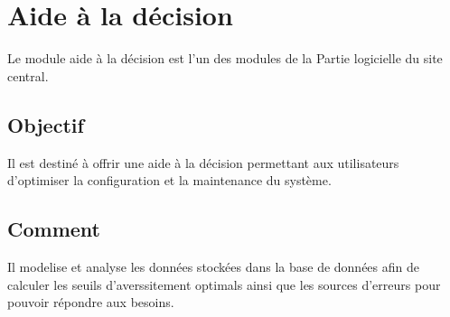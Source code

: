 \section{Aide à la décision}
Le module aide à la décision est l'un des modules de la Partie logicielle du site central. 

\subsection{Objectif}Il est destiné à offrir une aide à la décision permettant aux utilisateurs 
d'optimiser la configuration et la maintenance du système.

\subsection{Comment} Il modelise et analyse les données stockées dans la base de données afin de calculer
les seuils d'averssitement optimals ainsi que les sources d'erreurs pour pouvoir répondre aux besoins.
